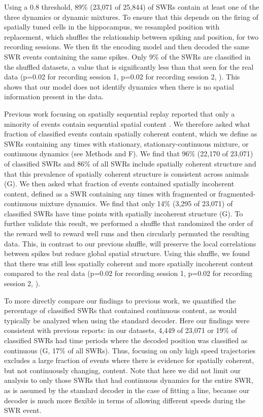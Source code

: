 \documentclass[9pt,lineno]{elife}
\begin{document}
Using a 0.8 threshold, 89\% (23,071 of 25,844) of SWRs contain at least one of the three dynamics or dynamic mixtures. To ensure that this depends on the firing of spatially tuned cells in the hippocampus, we resampled position with replacement, which shuffles the relationship between spiking and position, for two recording sessions. We then fit the encoding model and then decoded the same SWR events containing the same spikes. Only 9\% of the SWRs are classified in the shuffled datasets, a value that is significantly less than that seen for the real data (p=0.02 for recording session 1, p=0.02 for recording session 2, ). This shows that our model does not identify dynamics when there is no spatial information present in the data.

Previous work focusing on spatially sequential replay reported that only a minority of events contain sequential spatial content \citep{KarlssonAwakereplayremote2009, FosterReversereplaybehavioural2006, DavidsonHippocampalReplayExtended2009}. We therefore asked what fraction of classified events contain spatially coherent content, which we define as SWRs containing any times with stationary, stationary-continuous mixture, or continuous dynamics (see Methods and F). We find that 96\% (22,170 of 23,071) of classified SWRs and 86\% of all SWRs include spatially coherent structure and that this prevalence of spatially coherent structure is consistent across animals (G). We then asked what fraction of events contained spatially incoherent content, defined as a SWR containing any times with fragmented or fragmented-continuous mixture dynamics. We find that only 14\% (3,295 of 23,071) of classified SWRs have time points with spatially incoherent structure (G). To further validate this result, we performed a shuffle that randomized the order of the reward well to reward well runs and then circularly permuted the resulting data. This, in contrast to our previous shuffle, will preserve the local correlations between spikes but reduce global spatial structure. Using this shuffle, we found that there was still less spatially coherent and more spatially incoherent content compared to the real data (p=0.02 for recording session 1, p=0.02 for recording session 2, ).

To more directly compare our findings to previous work, we quantified the percentage of classified SWRs that contained continuous content, as would typically be analyzed when using the standard decoder. Here our findings were consistent with previous reports: in our datasets, 4,449 of 23,071 or 19\% of classified SWRs had time periods where the decoded position was classified as continuous (G, 17\% of all SWRs). Thus, focusing on only high speed trajectories excludes a large fraction of events where there is evidence for spatially coherent, but not continuously changing, content. Note that here we did not limit our analysis to only those SWRs that had continuous dynamics for the entire SWR, as is assumed by the standard decoder in the case of fitting a line, because our decoder is much more flexible in terms of allowing different speeds during the SWR event.
\end{document}
